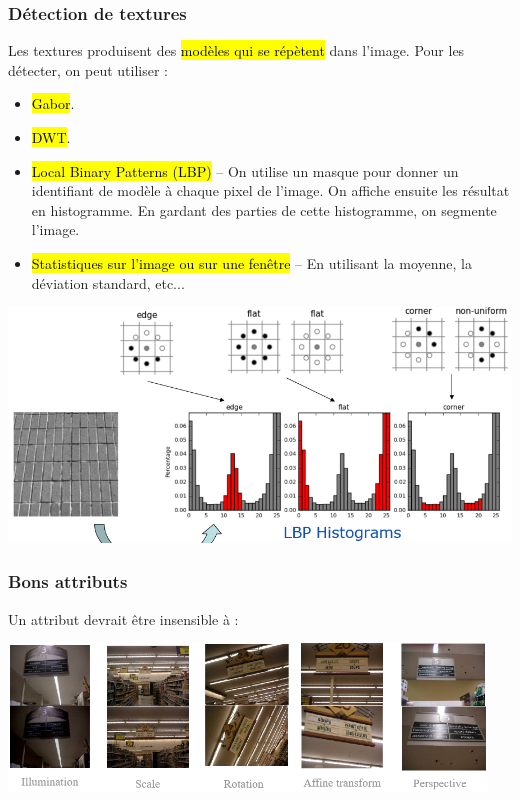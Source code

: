 \documentclass[letterpaper, 12pt]{article}
\newcommand{\alinea}{
\hspace*{0.5cm}}
\newcommand{\red}[1]{
	\textcolor{red}{#1}}
\begin{document}
		\subsubsection{Détection de textures}
			\alinea Les textures produisent des \hl{modèles qui se répètent} dans l'image. Pour les détecter, on peut utiliser :
				\begin{itemize}
					\setlength\itemsep{0cm}
					\item \hl{Gabor}.
					\item \hl{DWT}.
					\item \red{\hl{Local Binary Patterns (LBP)}} -- On utilise un masque pour donner un identifiant de modèle 
						à chaque pixel de l'image. On affiche ensuite les résultat en histogramme. En gardant des parties de 
						cette histogramme, on segmente l'image. 
					\item \hl{Statistiques sur l'image ou sur une fenêtre} -- En utilisant la moyenne, la déviation standard, etc...
				\end{itemize}
			\begin{center}
				\includegraphics[width=5.5in]{Images/lbp}
			\end{center}
		\subsubsection{Bons attributs}
			\alinea Un attribut devrait être insensible à :
				\begin{center}
					\includegraphics[width=5in]{Images/good-feature}
				\end{center}
			\pagebreak
\end{document}
